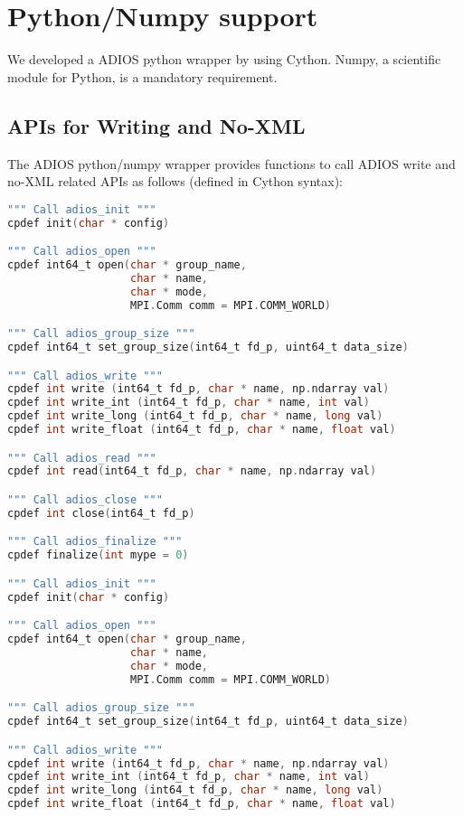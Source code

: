 \section{Python/Numpy support}
\label{section-bindings-numpy}
We developed a ADIOS python wrapper by using Cython. Numpy, a scientific module for Python, is a mandatory requirement. 

\subsection{APIs for Writing and No-XML}
The ADIOS python/numpy wrapper provides functions to call ADIOS write and no-XML related APIs as follows (defined in Cython syntax):
\begin{lstlisting}[language=C,frame=single, backgroundcolor=\color{gray85},caption={Functions for writing and No-XML},label={},]
""" Call adios_init """
cpdef init(char * config)

""" Call adios_open """
cpdef int64_t open(char * group_name,
                   char * name,
                   char * mode,
                   MPI.Comm comm = MPI.COMM_WORLD)

""" Call adios_group_size """
cpdef int64_t set_group_size(int64_t fd_p, uint64_t data_size)

""" Call adios_write """
cpdef int write (int64_t fd_p, char * name, np.ndarray val)
cpdef int write_int (int64_t fd_p, char * name, int val)
cpdef int write_long (int64_t fd_p, char * name, long val)
cpdef int write_float (int64_t fd_p, char * name, float val)

""" Call adios_read """
cpdef int read(int64_t fd_p, char * name, np.ndarray val)

""" Call adios_close """
cpdef int close(int64_t fd_p)

""" Call adios_finalize """
cpdef finalize(int mype = 0)

""" Call adios_init """
cpdef init(char * config)

""" Call adios_open """
cpdef int64_t open(char * group_name,
                   char * name,
                   char * mode,
                   MPI.Comm comm = MPI.COMM_WORLD)

""" Call adios_group_size """
cpdef int64_t set_group_size(int64_t fd_p, uint64_t data_size)

""" Call adios_write """
cpdef int write (int64_t fd_p, char * name, np.ndarray val)
cpdef int write_int (int64_t fd_p, char * name, int val)
cpdef int write_long (int64_t fd_p, char * name, long val)
cpdef int write_float (int64_t fd_p, char * name, float val)


\end{lstlisting}
